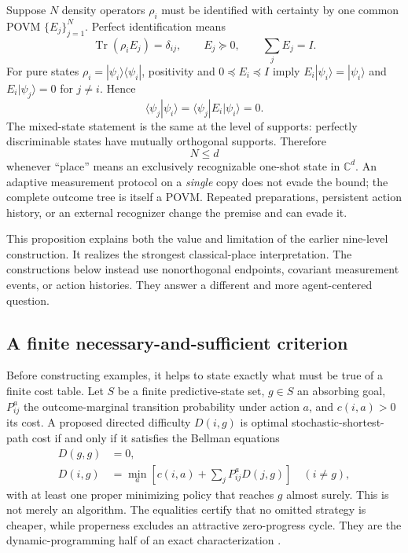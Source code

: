 \documentclass[11pt]{article}
\newcommand{\Tr}{\operatorname{Tr}}
\begin{document}
Suppose $N$ density operators $\rho_i$ must be identified with certainty by
one common POVM $\{E_j\}_{j=1}^N$. Perfect identification means
\begin{equation}
 \Tr(\rho_iE_j)=\delta_{ij},\qquad E_j\succeq0,
 \qquad\sum_jE_j=I. \label{eq:perfect-discrimination}
\end{equation}
For pure states $\rho_i=|\psi_i\rangle\langle\psi_i|$, positivity and
$0\preceq E_i\preceq I$ imply
$E_i|\psi_i\rangle=|\psi_i\rangle$ and
$E_i|\psi_j\rangle=0$ for $j\ne i$. Hence
\begin{equation}
 \langle\psi_j|\psi_i\rangle
 =\langle\psi_j|E_i|\psi_i\rangle=0.
\end{equation}
The mixed-state statement is the same at the level of supports: perfectly
discriminable states have mutually orthogonal supports. Therefore
\begin{equation}
 N\le d \label{eq:one-shot-bound}
\end{equation}
whenever ``place'' means an exclusively recognizable one-shot state in
$\mathbb C^d$. An adaptive measurement protocol on a \emph{single} copy does
not evade the bound; the complete outcome tree is itself a POVM. Repeated
preparations, persistent action history, or an external recognizer change the
premise and can evade it.

This proposition explains both the value and limitation of the earlier
nine-level construction. It realizes the strongest classical-place
interpretation. The constructions below instead use nonorthogonal endpoints,
covariant measurement events, or action histories. They answer a different
and more agent-centered question.

\subsection{A finite necessary-and-sufficient criterion}

Before constructing examples, it helps to state exactly what must be true of a
finite cost table. Let $S$ be a finite predictive-state set, $g\in S$ an
absorbing goal, $P^a_{ij}$ the outcome-marginal transition probability under
action $a$, and $c(i,a)>0$ its cost. A proposed directed difficulty
$D(i,g)$ is optimal stochastic-shortest-path cost if and only if it satisfies
the Bellman equations
\begin{align}
 D(g,g)&=0,\label{eq:lowdim-bellman-goal}\\
 D(i,g)&=\min_a\left[c(i,a)+\sum_jP^a_{ij}D(j,g)\right]
 \quad(i\ne g), \label{eq:lowdim-bellman}
\end{align}
with at least one proper minimizing policy that reaches $g$ almost surely.
This is not merely an algorithm. The equalities certify that no omitted
strategy is cheaper, while properness excludes an attractive zero-progress
cycle. They are the dynamic-programming half of an exact characterization
\cite{bellman1957,bertsekas1991,puterman1994}.
\end{document}
